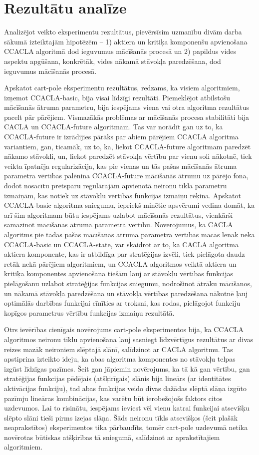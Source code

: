 \documentclass{ludis} %
\begin{document}
\section{Rezultātu analīze}
Analizējot veikto eksperimentu rezultātus, pievērsīsim uzmanību divām darba
sākumā izteiktajām hipotēzēm -- 1) aktiera un kritiķa komponenšu apvienošana
CCACLA algoritmā dod ieguvumus mācīšanās procesā un 2) papildus vides aspektu
apgūšana, konkrētāk, vides nākamā stāvokļa paredzēšana, dod ieguvumus mācīšanās
procesā.

Apskatot cart-pole eksperimentu rezultātus, redzams, ka visiem algoritmiem,
izņemot CCACLA-basic, bija visai līdzīgi rezultāti. Piemeklējot atbilstošu
mācīšanās ātruma parametru, bija iespējams viena vai otra algoritma rezultātus
pacelt pār pārējiem. Vismazākās problēmas ar mācīšanās procesa stabilitāti bija
CACLA un CCACLA-future algoritmam. Tas var norādīt gan uz to, ka CCACLA-future
ir izrādījies pārāks par abiem pārējiem CCACLA algoritma variantiem, gan,
ticamāk, uz to, ka, liekot CCACLA-future algoritmam paredzēt nākamo stāvokli, un,
liekot paredzēt stāvokļa vērtību par vienu soli nākotnē, tiek veikta īpatnēja
regularizācija, kas pie vienas un tās pašas mācīšanās ātruma parametra vērtības
palēnina CCACLA-future mācīšanās ātrumu uz pārējo fona, dodot nosacītu
pretsparu regulārajām apvienotā neironu tīkla parametru izmaiņām, kas notiek uz
stāvokļu vērtības funkcijas izmaiņu rēķina. Apskatot CCACLA-basic algoritma
sniegumu, iepriekš minētie apsvērumi vedina domāt, ka arī šim algoritmam būtu
iespējams uzlabot mācīšanās rezultātus, vienkārši samazinot mācīšanās ātruma
parametra vērtību. Novērojumus, ka CACLA algoritms pie tādās pašas mācīšanās
ātruma parametra vērtības mācās lēnāk nekā CCACLA-basic un CCACLA-state, var
skaidrot ar to, ka CACLA algoritma aktiera komponente, kas ir atbildīga par
stratēģijas izvēli, tiek pielāgota daudz retāk nekā pārējiem algoritmiem, un
CCACLA algoritmos veiktā aktiera un kritiķa komponentes apvienošana tiešām ļauj
ar stāvokļu vērtības funkcijas pielāgošanu uzlabot stratēģijas funkcijas
sniegumu, nodrošinot ātrāku mācīšanos, un nākamā stāvokļa paredzēšana un
stāvokļa vērtības paredzēšana nākotnē ļauj optimālās darbības funkcijai cīnīties
ar troksni, kas rodas, pielāgojot funkciju kopīgos parametrus vērtību funkcijas
izmaiņu rezultātā.

Otrs ievērības cienīgais novērojums cart-pole eksperimentos bija, ka CCACLA
algoritmos neironu tīklu apvienošana ļauj sasniegt līdzvērtīgus rezultātus ar
divas reizes mazāk neironiem slēptajā slānī, salīdzinot ar CACLA algoritmu. Tas
apstiprina izteikto ideju, ka abas algoritma komponentes no stāvokļu telpas
izgūst līdzīgas pazīmes. Šeit gan jāpiemin novērojums, ka tā kā gan vērtību, gan
stratēģijas funkcijas pēdējais (atšķirīgais) slānis bija lineārs (ar identitātes
aktivācijas funkciju), tad abas funkcijas veido divas dažādas slēptā slāņa
izgūto pazīmju lineāras kombinācijas, kas varētu būt ierobežojošs faktors citos
uzdevumos. Lai to risinātu, iespējams ieviest vēl vienu katrai funkcijai
atsevišķu slēpto slāni tieši pirms izejas slāņa. Šāds neironu tīkls atsevišķos
(šeit plašāk neaprakstītos) eksperimentos tika pārbaudīts, tomēr cart-pole
uzdevumā netika novērotas būtiskas atšķirības tā sniegumā, salīdzinot ar
aprakstītajiem algoritmiem.
\end{document}
